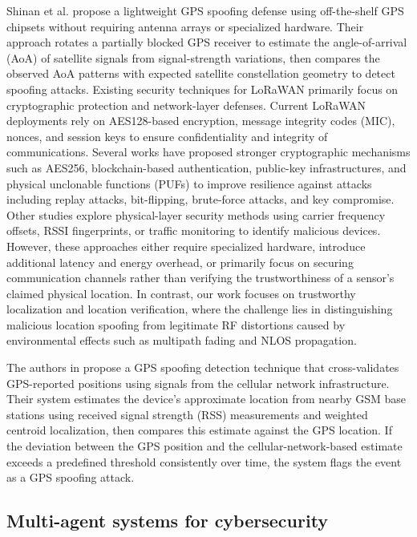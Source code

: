 \documentclass[10pt, twocolumn, letterpaper]{article}
\begin{document}
Shinan et al.  \cite{shinan} propose a lightweight GPS spoofing defense using off-the-shelf GPS chipsets without requiring antenna arrays or specialized hardware. Their approach rotates a partially blocked GPS receiver to estimate the angle-of-arrival (AoA) of satellite signals from signal-strength variations, then compares the observed AoA patterns with expected satellite constellation geometry to detect spoofing attacks.
Existing security techniques for LoRaWAN \cite{lorasecurity} primarily focus on cryptographic protection and network-layer defenses. Current LoRaWAN deployments rely on AES128-based encryption, message integrity codes (MIC), nonces, and session keys to ensure confidentiality and integrity of communications. Several works have proposed stronger cryptographic mechanisms such as AES256, blockchain-based authentication, public-key infrastructures, and physical unclonable functions (PUFs) to improve resilience against attacks including replay attacks, bit-flipping, brute-force attacks, and key compromise. Other studies explore physical-layer security methods using carrier frequency offsets, RSSI fingerprints, or traffic monitoring to identify malicious devices. However, these approaches either require specialized hardware, introduce additional latency and energy overhead, or primarily focus on securing communication channels rather than verifying the trustworthiness of a sensor’s claimed physical location. In contrast, our work focuses on trustworthy localization and location verification, where the challenge lies in distinguishing malicious location spoofing from legitimate RF distortions caused by environmental effects such as multipath fading and NLOS propagation.

The authors in \cite{wisec2} propose a GPS spoofing detection technique that cross-validates GPS-reported positions using signals from the cellular network infrastructure. Their system estimates the device’s approximate location from nearby GSM base stations using received signal strength (RSS) measurements and weighted centroid localization, then compares this estimate against the GPS location. If the deviation between the GPS position and the cellular-network-based estimate exceeds a predefined threshold consistently over time, the system flags the event as a GPS spoofing attack.


\subsection{Multi-agent systems for cybersecurity}
\end{document}

